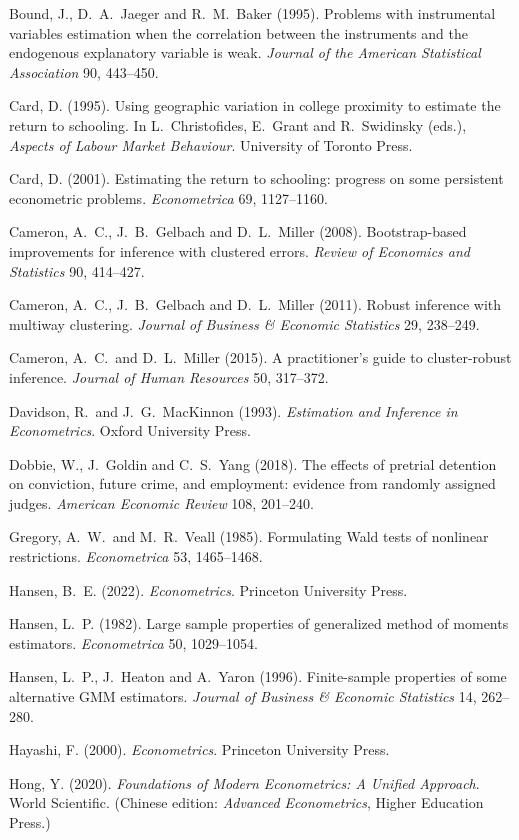 \documentclass[11pt,a4paper]{article}
\begin{document}
{\begin{description}[leftmargin=1.4em,labelindent=0pt,itemsep=2pt,font=\normalfont]
\item Bound, J., D.~A.~Jaeger and R.~M.~Baker (1995). Problems with instrumental variables estimation when the correlation between the instruments and the endogenous explanatory variable is weak. \emph{Journal of the American Statistical Association} 90, 443--450.
\item Card, D. (1995). Using geographic variation in college proximity to estimate the return to schooling. In L.~Christofides, E.~Grant and R.~Swidinsky (eds.), \emph{Aspects of Labour Market Behaviour}. University of Toronto Press.
\item Card, D. (2001). Estimating the return to schooling: progress on some persistent econometric problems. \emph{Econometrica} 69, 1127--1160.
\item Cameron, A.~C., J.~B.~Gelbach and D.~L.~Miller (2008). Bootstrap-based improvements for inference with clustered errors. \emph{Review of Economics and Statistics} 90, 414--427.
\item Cameron, A.~C., J.~B.~Gelbach and D.~L.~Miller (2011). Robust inference with multiway clustering. \emph{Journal of Business \& Economic Statistics} 29, 238--249.
\item Cameron, A.~C.\ and D.~L.~Miller (2015). A practitioner's guide to cluster-robust inference. \emph{Journal of Human Resources} 50, 317--372.
\item Davidson, R.\ and J.~G.~MacKinnon (1993). \emph{Estimation and Inference in Econometrics}. Oxford University Press.
\item Dobbie, W., J.~Goldin and C.~S.~Yang (2018). The effects of pretrial detention on conviction, future crime, and employment: evidence from randomly assigned judges. \emph{American Economic Review} 108, 201--240.
\item Gregory, A.~W.\ and M.~R.~Veall (1985). Formulating Wald tests of nonlinear restrictions. \emph{Econometrica} 53, 1465--1468.
\item Hansen, B.~E. (2022). \emph{Econometrics}. Princeton University Press.
\item Hansen, L.~P. (1982). Large sample properties of generalized method of moments estimators. \emph{Econometrica} 50, 1029--1054.
\item Hansen, L.~P., J.~Heaton and A.~Yaron (1996). Finite-sample properties of some alternative GMM estimators. \emph{Journal of Business \& Economic Statistics} 14, 262--280.
\item Hayashi, F. (2000). \emph{Econometrics}. Princeton University Press.
\item Hong, Y. (2020). \emph{Foundations of Modern Econometrics: A Unified Approach}. World Scientific. (Chinese edition: \emph{Advanced Econometrics}, Higher Education Press.)

\end{description}}
\end{document}
